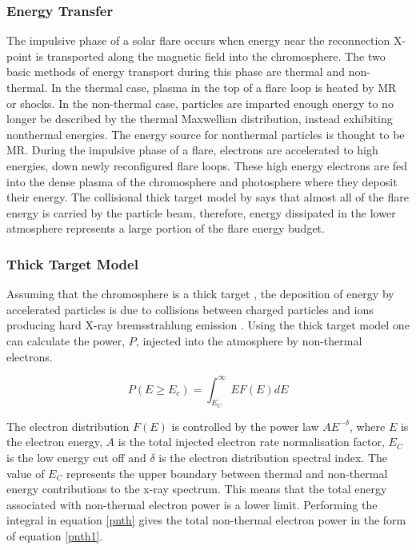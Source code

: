\subsubsection{Energy Transfer}
The impulsive phase of a solar flare occurs when energy near the reconnection X-point is transported along the magnetic field into the chromosphere. The two basic methods of energy transport during this phase are thermal and non-thermal. In the thermal case, plasma in the top of a flare loop is heated by MR or shocks. In the non-thermal case, particles are imparted enough energy to no longer be described by the thermal Maxwellian distribution, instead exhibiting nonthermal energies. The energy source for nonthermal particles is thought to be MR. During the impulsive phase of a flare, electrons are accelerated to high energies, down newly reconfigured flare loops. These high energy electrons are fed into the dense plasma of the chromosphere and photosphere where they deposit their energy. The collisional thick target model by \cite{1971SoPh...18..489B} says that almost all of the flare energy is carried by the particle beam, therefore, energy dissipated in the lower atmosphere represents a large portion of the flare energy budget.

\subsubsection{Thick Target Model} Assuming that the chromosphere is a thick target , the deposition of energy by accelerated particles is due to collisions between charged particles and ions producing hard X-ray bremsstrahlung emission \citep{1967SvA....11..258K}. Using the thick target model \citep{1971SoPh...18..489B} one can calculate the power, $P$, injected into the atmosphere by non-thermal electrons.  
 
\begin{equation}\label{pnth}
P(E \geq E_{c}) = \int_{E_{C}}^{\infty} EF(E)dE
\end{equation}

The electron distribution $F(E)$ is controlled by the power law $AE^{-\delta}$, where $E$ is the electron energy, $A$ is the total injected electron rate normalisation factor, $E_{C}$ is the low energy cut off and $\delta$ is the electron distribution spectral index. The value of $E_{C}$ represents the upper boundary between thermal and non-thermal energy contributions to the x-ray spectrum. This means that the total energy associated with non-thermal electron power is a lower limit. Performing the integral in equation \ref{pnth} gives the total non-thermal electron power in the form of equation \ref{pnth1}.

